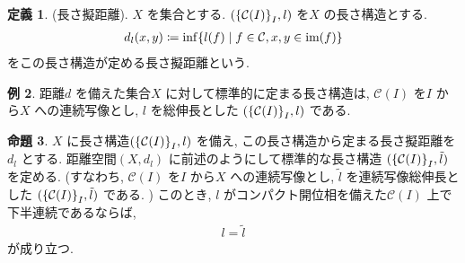 \documentclass[platex, driver=dvipdfm, ja = standard, 10pt, fleqn, label-section=none]{bxjsarticle}
\theoremstyle{definition}
\newtheorem{dfn}{定義}[section]
\newtheorem{ex}[dfn]{例}
\newtheorem{prop}[dfn]{命題}
\newcommand{\cbra}[1]{\mleft\{#1\mright\}}
\renewcommand{\;}{\, ; \,}
\begin{document}
\begin{dfn}(長さ擬距離). $X$ を集合とする. $(\cbra{\mathcal C(I)}_I, l)$ を$X$ の長さ構造とする.    
\begin{align*} d_l (x, y) \coloneqq \inf \cbra{l(f) \mid f \in \mathcal C , x, y \in \textrm{im}(f) }\end{align*}
をこの長さ構造が定める長さ擬距離という. 
\end{dfn}

\begin{ex} 距離$d$ を備えた集合$X$ に対して標準的に定まる長さ構造は, $\mathcal C(I)$ を$I$ から$X$ への連続写像とし, $l$ を総伸長とした $(\cbra{ \mathcal C(I)}_I, l)$ である. 
\end{ex}

\begin{prop} $X$ に長さ構造$(\cbra{ \mathcal C(I)}_I, l)$ を備え, この長さ構造から定まる長さ擬距離を$d_l$ とする. 距離空間$(X, d_l)$ に前述のようにして標準的な長さ構造 $(\cbra{ \mathcal C(I)}_I, \tilde l)$ を定める. (すなわち, $\mathcal C(I)$ を$I$ から$X$ への連続写像とし, $\tilde l$ を連続写像総伸長とした $(\cbra{ \mathcal C(I)}_I, \tilde l)$ である. ) このとき, $l$ がコンパクト開位相を備えた$\mathcal C (I)$ 上で下半連続であるならば, 
\begin{align*} l = \tilde l \end{align*}
が成り立つ. 

\end{prop}
\end{document}
